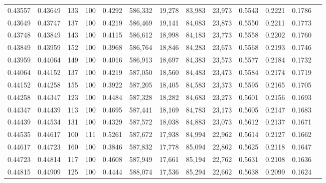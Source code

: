 \begin{tabular}{rrrrrrrrrrrrr}
0.43557 & 0.43649 &   133 & 100 &                                     0.4292 & 586,332 &  19,278 &  83,983 &  23,973 & 0.5543 & 0.2221 & 0.1786 \\
0.43649 & 0.43747 &   137 & 100 &                                     0.4219 & 586,469 &  19,141 &  84,083 &  23,873 & 0.5550 & 0.2211 & 0.1773 \\
0.43748 & 0.43849 &   143 & 100 &                                     0.4115 & 586,612 &  18,998 &  84,183 &  23,773 & 0.5558 & 0.2202 & 0.1760 \\
0.43849 & 0.43959 &   152 & 100 &                                     0.3968 & 586,764 &  18,846 &  84,283 &  23,673 & 0.5568 & 0.2193 & 0.1746 \\
0.43959 & 0.44064 &   149 & 100 &                                     0.4016 & 586,913 &  18,697 &  84,383 &  23,573 & 0.5577 & 0.2184 & 0.1732 \\
0.44064 & 0.44152 &   137 & 100 &                                     0.4219 & 587,050 &  18,560 &  84,483 &  23,473 & 0.5584 & 0.2174 & 0.1719 \\
0.44152 & 0.44258 &   155 & 100 &                                     0.3922 & 587,205 &  18,405 &  84,583 &  23,373 & 0.5595 & 0.2165 & 0.1705 \\
0.44258 & 0.44347 &   123 & 100 &                                     0.4484 & 587,328 &  18,282 &  84,683 &  23,273 & 0.5601 & 0.2156 & 0.1693 \\
0.44347 & 0.44439 &   113 & 100 &                                     0.4695 & 587,441 &  18,169 &  84,783 &  23,173 & 0.5605 & 0.2147 & 0.1683 \\
0.44439 & 0.44534 &   131 & 100 &                                     0.4329 & 587,572 &  18,038 &  84,883 &  23,073 & 0.5612 & 0.2137 & 0.1671 \\
0.44535 & 0.44617 &   100 & 111 &                                     0.5261 & 587,672 &  17,938 &  84,994 &  22,962 & 0.5614 & 0.2127 & 0.1662 \\
0.44617 & 0.44723 &   160 & 100 &                                     0.3846 & 587,832 &  17,778 &  85,094 &  22,862 & 0.5625 & 0.2118 & 0.1647 \\
0.44723 & 0.44814 &   117 & 100 &                                     0.4608 & 587,949 &  17,661 &  85,194 &  22,762 & 0.5631 & 0.2108 & 0.1636 \\
0.44815 & 0.44909 &   125 & 100 &                                     0.4444 & 588,074 &  17,536 &  85,294 &  22,662 & 0.5638 & 0.2099 & 0.1624 \\

\end{tabular}
